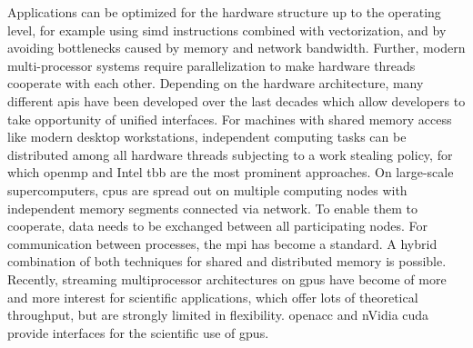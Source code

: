 
Applications can be optimized for the hardware structure up to the operating level, for example using \gls{simd} instructions combined with vectorization, and by avoiding bottlenecks caused by memory and network bandwidth.
Further, modern multi-processor systems require parallelization to make hardware threads cooperate with each other.%
Depending on the hardware architecture, many different \glspl{api} have been developed over the last decades which allow developers to take opportunity of unified interfaces.
For machines with shared memory access like modern desktop workstations, independent computing tasks can be distributed among all hardware threads subjecting to a work stealing policy, for which \gls{openmp}\textsuperscript{\textregistered} \textcite{openmp50} and Intel\textsuperscript{\textregistered} \gls{tbb} \textcite{tbb2018} are the most prominent approaches.
On large-scale supercomputers, \glspl{cpu} are spread out on multiple computing nodes with independent memory segments connected via network. To enable them to cooperate, data needs to be exchanged between all participating nodes. For communication between processes, the \gls{mpi} \textcite{mpi31} has become a standard. A hybrid combination of both techniques for shared and distributed memory is possible.
Recently, streaming multiprocessor architectures on \glspl{gpu} have become of more and more interest for scientific applications, which offer lots of theoretical throughput, but are strongly limited in flexibility. \gls{openacc}\textsuperscript{\textregistered} \textcite{openacc27} and nVidia\textsuperscript{\textregistered} \gls{cuda}\textsuperscript{\textregistered} \textcite{cuda10} provide interfaces for the scientific use of \glspl{gpu}.



